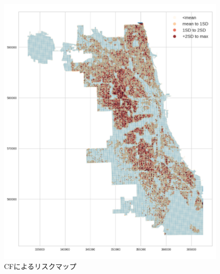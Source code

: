 \begin{figure}[H]
  \centering %
  \includegraphics[scale=0.15]{./figures/CF_riskmap.png}
  \caption{CFによるリスクマップ}
  \label{fig:non-crime-timeseries-cf-risk}
\end{figure}

